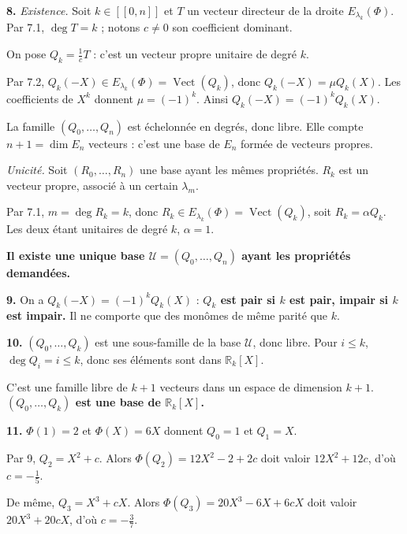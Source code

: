 \documentclass[11pt,a4paper]{article}
\providecommand{\Q}{\mathbb{Q}}
\newcommand{\equationajustee}[1]{%
  \sbox{\boiteequation}{$\displaystyle #1$}%
  \ifdim\wd\boiteequation>\linewidth
    \[\resizebox{\linewidth}{!}{\usebox{\boiteequation}}\]%
  \else
    \[#1\]%
  \fi}
\begin{document}
\textbf{8.} \emph{Existence.} Soit \(k\in[\![0,n]\!]\) et \(T\) un vecteur directeur de la droite \(E_{\lambda_k}(\Phi)\). Par 7.1, \(\deg T=k\) ; notons \(c\neq0\) son coefficient dominant.

On pose \(Q_k=\frac1cT\) : c'est un vecteur propre unitaire de degré \(k\).

Par 7.2, \(Q_k(-X)\in E_{\lambda_k}(\Phi)=\operatorname{Vect}(Q_k)\), donc \(Q_k(-X)=\mu Q_k(X)\). Les coefficients de \(X^k\) donnent \(\mu=(-1)^k\). Ainsi \(Q_k(-X)=(-1)^kQ_k(X)\).

La famille \((Q_0,\dots,Q_n)\) est échelonnée en degrés, donc libre. Elle compte \(n+1=\dim E_n\) vecteurs : c'est une base de \(E_n\) formée de vecteurs propres.

\emph{Unicité.} Soit \((R_0,\dots,R_n)\) une base ayant les mêmes propriétés. \(R_k\) est un vecteur propre, associé à un certain \(\lambda_m\).

Par 7.1, \(m=\deg R_k=k\), donc \(R_k\in E_{\lambda_k}(\Phi)=\operatorname{Vect}(Q_k)\), soit \(R_k=\alpha Q_k\). Les deux étant unitaires de degré \(k\), \(\alpha=1\).

\textbf{Il existe une unique base \(\mathcal U=(Q_0,\dots,Q_n)\) ayant les propriétés demandées.}

\textbf{9.} On a \(Q_k(-X)=(-1)^kQ_k(X)\) : \textbf{\(Q_k\) est pair si \(k\) est pair, impair si \(k\) est impair.} Il ne comporte que des monômes de même parité que \(k\).

\textbf{10.} \((Q_0,\dots,Q_k)\) est une sous-famille de la base \(\mathcal U\), donc libre. Pour \(i\le k\), \(\deg Q_i=i\le k\), donc ses éléments sont dans \(\mathbb R_k[X]\).

C'est une famille libre de \(k+1\) vecteurs dans un espace de dimension \(k+1\). \textbf{\((Q_0,\dots,Q_k)\) est une base de \(\mathbb R_k[X]\).}

\textbf{11.} \(\Phi(1)=2\) et \(\Phi(X)=6X\) donnent \(Q_0=1\) et \(Q_1=X\).

Par 9, \(Q_2=X^2+c\). Alors \(\Phi(Q_2)=12X^2-2+2c\) doit valoir \(12X^2+12c\), d'où \(c=-\frac15\).

De même, \(Q_3=X^3+cX\). Alors \(\Phi(Q_3)=20X^3-6X+6cX\) doit valoir \(20X^3+20cX\), d'où \(c=-\frac37\).

\equationajustee{\boxed{\begin{aligned}Q_0&=1\\Q_1&=X\\Q_2&=X^2-\frac15\\Q_3&=X^3-\frac37X\end{aligned}}}
\end{document}
